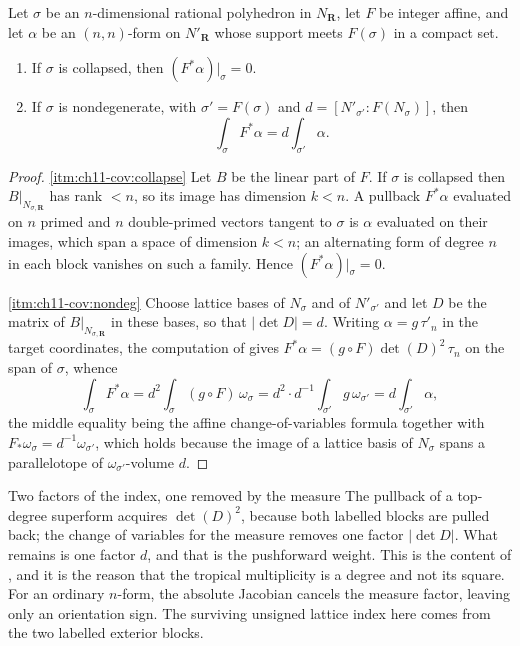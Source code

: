\begin{lemma}
\label{lem:ch11-cell-change-of-variables}
Let $\sigma$ be an $n$-dimensional rational polyhedron in $N_{\mathbf R}$,
let $F$ be integer affine, and let $\alpha$ be an $(n,n)$-form on
$N'_{\mathbf R}$ whose support meets $F(\sigma)$ in a compact set.
\begin{enumerate}
\item\label{itm:ch11-cov:collapse}
  If $\sigma$ is collapsed, then $(F^*\alpha)|_\sigma=0$.
\item\label{itm:ch11-cov:nondeg}
  If $\sigma$ is nondegenerate, with $\sigma'=F(\sigma)$ and
  $d=[N'_{\sigma'}:F(N_\sigma)]$, then
  \[
   \int_\sigma F^*\alpha=d\int_{\sigma'}\alpha .
  \]
\end{enumerate}
\end{lemma}

\begin{proof}
\cref{itm:ch11-cov:collapse}
Let $B$ be the linear part of $F$.  If $\sigma$ is collapsed then
$B|_{N_{\sigma,\mathbf R}}$ has rank $<n$, so its image has dimension
$k<n$.  A pullback $F^*\alpha$ evaluated on $n$ primed and $n$
double-primed vectors tangent to $\sigma$ is $\alpha$ evaluated on their
images, which span a space of dimension $k<n$; an alternating form of degree
$n$ in each block vanishes on such a family.  Hence $(F^*\alpha)|_\sigma=0$.

\cref{itm:ch11-cov:nondeg}
Choose lattice bases of $N_\sigma$ and of $N'_{\sigma'}$ and let
$D$ be the matrix of $B|_{N_{\sigma,\mathbf R}}$ in these bases, so that
$|\det D|=d$.  Writing $\alpha=g\,\tau'_n$ in the target coordinates, the
computation of  gives
$F^*\alpha=(g\circ F)\det(D)^2\,\tau_n$ on the span of $\sigma$, whence
\[
 \int_\sigma F^*\alpha
 =d^2\int_\sigma (g\circ F)\,\omega_\sigma
 =d^2\cdot d^{-1}\int_{\sigma'}g\,\omega_{\sigma'}
 =d\int_{\sigma'}\alpha ,
\]
the middle equality being the affine change-of-variables formula together
with $F_*\omega_\sigma=d^{-1}\omega_{\sigma'}$, which holds because the
image of a lattice basis of $N_\sigma$ spans a parallelotope of
$\omega_{\sigma'}$-volume $d$.
\end{proof}

\begin{warning}{Two factors of the index, one removed by the measure}
The pullback of a top-degree superform acquires $\det(D)^2$, because both
labelled blocks are pulled back; the change of variables for the measure
removes one factor $|\det D|$.  What remains is one factor $d$, and that is
the pushforward weight.  This is the content of
, and it is the reason that the tropical
multiplicity is a degree and not its square.  For an ordinary $n$-form,
the absolute Jacobian cancels the measure factor, leaving only an
orientation sign.  The surviving unsigned lattice index here comes from
the two labelled exterior blocks.
\end{warning}

